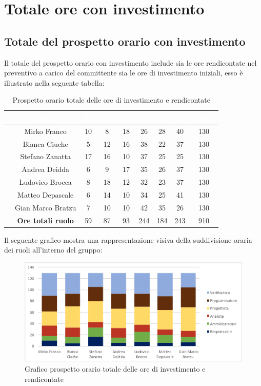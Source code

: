 \section{Totale ore con investimento}
\subsection{Totale del prospetto orario con investimento}
Il totale del prospetto orario con investimento include sia le ore rendicontate nel preventivo a carico del committente sia le ore di investimento iniziali, esso è illustrato nella seguente tabella:

\begin{table}[ht]
	\begin{center}
		\begin{tabular}{ccccccccc}
			\rowcolor{coolblack}
			\hline
			& \textcolor{white}{Nome} & \textcolor{white}{Re} & \textcolor{white}{Am} & \textcolor{white}{An} & \textcolor{white}{Pt} &\textcolor{white}{Pr} & \textcolor{white}{Ve} & \textcolor{white}{Totale} \\
			\hline
			&Mirko Franco & 10 & 8 & 18 & 26& 28 & 40 & 130  \\
			&Bianca Ciuche & 5& 12& 16& 38 & 22& 37 &130 \\
			&Stefano Zanatta & 17 & 16& 10 & 37 & 25 & 25 & 130\\
			&Andrea Deidda &  6& 9 & 17 &35 & 26 & 37 & 130\\
			&Ludovico Brocca & 8& 18 & 12 & 32 & 23 & 37 & 130 \\
			&Matteo Depascale & 6& 14& 10& 34& 25& 41& 130\\
			&Gian Marco Bratzu & 7& 10 & 10 & 42 & 35 & 26 &130 \\
			\hline
			&\textbf{Ore totali ruolo} & 59& 87 & 93 & 244 & 184 & 243 & 910 \\
		\end{tabular}
		\caption{Prospetto orario totale delle ore di investimento e rendicontate}
	\end{center}
\end{table}

Il seguente grafico mostra una rappresentazione visiva della suddivisione oraria dei ruoli all'interno del gruppo:
\begin{figure}[!ht]
	\begin{center}
		\includegraphics[scale=0.70]{images/grafoOreInvestimento.png}
		\caption{Grafico prospetto orario totale delle ore di investimento e rendicontate}
	\end{center}
\end{figure}
\newpage
